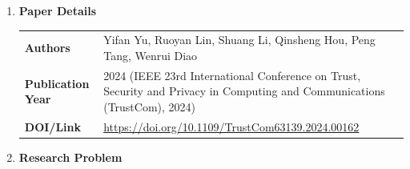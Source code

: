 \documentclass[11pt,a4paper]{article}
\newcommand{\entrypart}[1]{\textbf{\color{accent}#1}\par\vspace{2pt}}
\begin{document}
\begin{enumerate}

    \item \entrypart{Paper Details}

    \begin{tabular}{@{}>{\bfseries}p{3.2cm} p{11.5cm}@{}}
        Authors          & Yifan Yu, Ruoyan Lin, Shuang Li, Qinsheng Hou, Peng Tang, Wenrui Diao \\[2pt]
        Publication Year & 2024 (IEEE 23rd International Conference on Trust, Security and Privacy in Computing and Communications (TrustCom), 2024) \\[2pt]
        DOI/Link         & \url{https://doi.org/10.1109/TrustCom63139.2024.00162}
    \end{tabular}

    \item \entrypart{Research Problem}


\end{enumerate}
\end{document}
